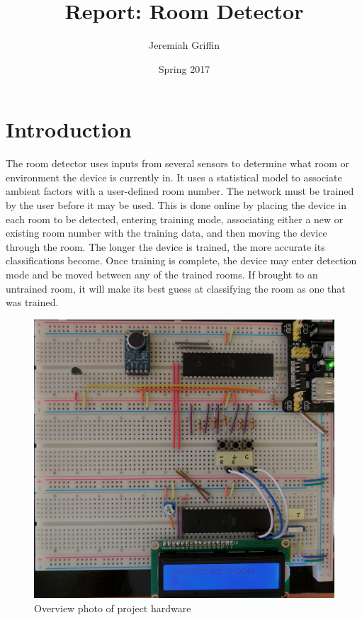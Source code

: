 \documentclass{article}
\title{Report: Room Detector}
\author{Jeremiah Griffin}
\date{Spring 2017}
\begin{document}
\maketitle
\newpage

\tableofcontents
\newpage


\section{Introduction}

The room detector uses inputs from several sensors to determine what
room or environment the device is currently in.  It uses a statistical
model to associate ambient factors with a user-defined room number.  The
network must be trained by the user before it may be used.  This is done
online by placing the device in each room to be detected, entering
training mode, associating either a new or existing room number with the
training data, and then moving the device through the room.  The longer
the device is trained, the more accurate its classifications become.
Once training is complete, the device may enter detection mode and be
moved between any of the trained rooms.  If brought to an untrained
room, it will make its best guess at classifying the room as one that
was trained.

\begin{figure}[h]
  \centering
  \noindent\includegraphics[width = \textwidth]{overview}
  \caption{Overview photo of project hardware}
  \label{photo:1}
\end{figure}
\end{document}
